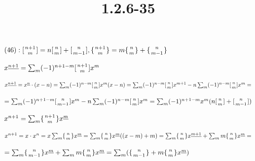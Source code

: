 \documentclass{article}
\title{1.2.6-35}
\begin{document}
\maketitle

$(46): [{{n+1}\atop m}] = n[{{n}\atop m}] + [{{n}\atop{m-1}}], \{{{n+1}\atop m}\} = m\{{{n}\atop m}\} + \{{{n}\atop{m-1}}\}$

$x^{\underline{n+1}} = \sum_m (-1)^{n+1-m} [{{n+1}\atop m}] x^m$

$x^{\underline{n+1}} = x^{\underline{n}} \cdot (x-n) = \sum_m (-1)^{n-m} [{{n}\atop m}] x^m (x-n) = \sum_m (-1)^{n-m} [{{n}\atop m}] x^{m+1} -n \sum_m (-1)^{n-m} [{{n}\atop m}]x^m =$

$= \sum_m (-1)^{n+1-m} [{{n}\atop {m-1}}] x^{m} -n \sum_m (-1)^{n-m} [{{n}\atop m}]x^m = \sum_m (-1)^{n+1-m}x^m(n[{{n}\atop m}] + [{{n}\atop {m-1}}])$

$x^{n+1} = \sum_{m} \{{{n+1}\atop m}\} x^{\underline{m}}$

$x^{n+1} = x \cdot x^n = x \sum_{m} \{{{n}\atop m}\} x^{\underline{m}} = \sum_{m} \{{{n}\atop m}\} x^{\underline{m}} ((x-m)+m) = \sum_{m} \{{{n}\atop m}\} x^{\underline{m+1}} + \sum_{m} m\{{{n}\atop m}\}x^{\underline{m}} =$

$= \sum_{m} \{{{n}\atop {m-1}}\} x^{\underline{m}} + \sum_{m} m\{{{n}\atop m}\}x^{\underline{m}} = \sum_m(\{{{n}\atop {m-1}}\} + m\{{{n}\atop m}\}x^{\underline{m}})$
\end{document}
